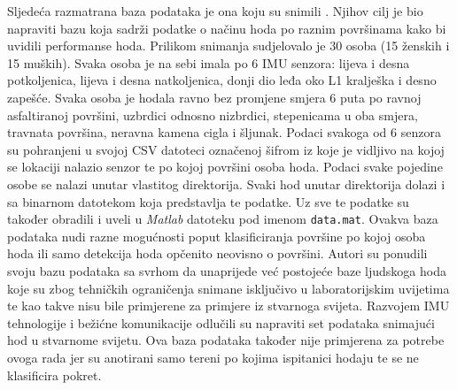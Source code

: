 \documentclass[times, utf8, diplomski]{fer}
\begin{document}
Sljedeća razmatrana baza podataka je ona koju su snimili \cite{uneven}. Njihov cilj je bio napraviti bazu koja sadrži podatke o
načinu hoda po raznim površinama kako bi uvidili performanse hoda. Prilikom snimanja sudjelovalo je 30 osoba (15 ženskih i
15 muških). Svaka osoba je na sebi imala po 6 IMU senzora: lijeva i desna potkoljenica, lijeva i desna natkoljenica, donji dio leđa
oko L1 kralješka i desno zapešće. Svaka osoba je hodala ravno bez promjene smjera 6 puta po ravnoj asfaltiranoj površini, uzbrdici
odnosno nizbrdici, stepenicama u oba smjera, travnata površina, neravna kamena cigla i šljunak. Podaci svakoga od 6 senzora su
pohranjeni u svojoj CSV datoteci označenoj šifrom iz koje je vidljivo na kojoj se lokaciji nalazio senzor te po kojoj površini
osoba hoda. Podaci svake pojedine osobe se nalazi unutar vlastitog direktorija. Svaki hod unutar direktorija dolazi i sa binarnom
datotekom koja predstavlja te podatke. Uz sve te podatke \cite{uneven} su također obradili i uveli u \textit{Matlab} datoteku pod 
imenom \texttt{data.mat}. Ovakva baza podataka nudi razne mogućnosti poput klasificiranja površine po kojoj osoba hoda ili samo 
detekcija hoda opčenito neovisno o površini. Autori su ponudili svoju bazu podataka sa svrhom da unaprijede već postojeće baze
ljudskoga hoda koje su zbog tehničkih ograničenja snimane isključivo u laboratorijskim uvijetima te kao takve nisu bile primjerene
za primjere iz stvarnoga svijeta. Razvojem IMU tehnologije i bežićne komunikacije \cite{uneven} odlučili su napraviti set podataka
snimajući hod u stvarnome svijetu. Ova baza podataka također nije primjerena za potrebe ovoga rada jer su anotirani samo tereni
po kojima ispitanici hodaju te se ne klasificira pokret.
\end{document}
